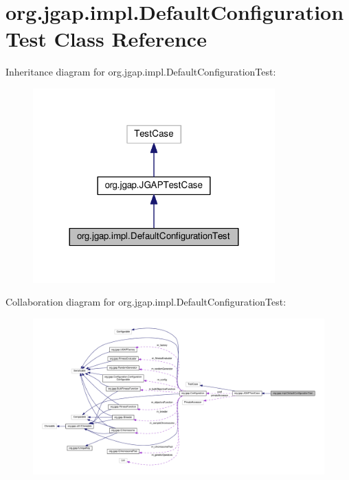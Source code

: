 \hypertarget{classorg_1_1jgap_1_1impl_1_1_default_configuration_test}{\section{org.\-jgap.\-impl.\-Default\-Configuration\-Test Class Reference}
\label{classorg_1_1jgap_1_1impl_1_1_default_configuration_test}
}


Inheritance diagram for org.\-jgap.\-impl.\-Default\-Configuration\-Test\-:
\nopagebreak
\begin{figure}[H]
\begin{center}
\leavevmode
\includegraphics[width=264pt]{classorg_1_1jgap_1_1impl_1_1_default_configuration_test__inherit__graph}
\end{center}
\end{figure}


Collaboration diagram for org.\-jgap.\-impl.\-Default\-Configuration\-Test\-:
\nopagebreak
\begin{figure}[H]
\begin{center}
\leavevmode
\includegraphics[width=350pt]{classorg_1_1jgap_1_1impl_1_1_default_configuration_test__coll__graph}
\end{center}
\end{figure}

